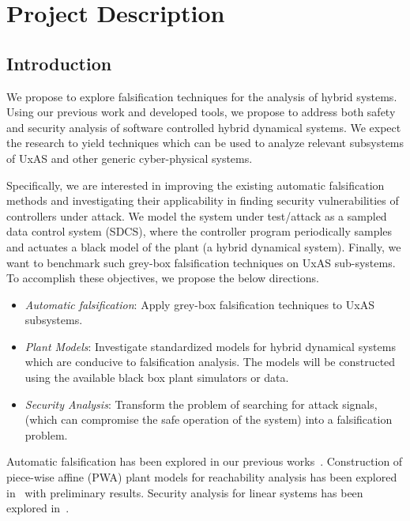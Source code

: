 \section{Project Description}

%
%
%

\subsection{Introduction}

We propose to explore falsification techniques for the analysis of
hybrid systems. Using our previous work and developed tools, we
propose to address both safety and security analysis of software
controlled hybrid dynamical systems. We expect the research to yield
techniques which can be used to analyze relevant subsystems of UxAS
and other generic cyber-physical systems.

Specifically, we are interested in improving the existing automatic
falsification methods and investigating their applicability in finding
security vulnerabilities of controllers under attack. We model the
system under test/attack as a sampled data control system (SDCS),
where the controller program periodically samples and actuates a
black model of the plant (a hybrid dynamical system). Finally, we want
to benchmark such grey-box falsification techniques on UxAS
sub-systems. To accomplish these objectives, we propose the below
directions.
\begin{itemize}
    \item \emph{Automatic falsification}: Apply grey-box falsification
        techniques to UxAS subsystems.
    \item \emph{Plant Models}: Investigate standardized models for
        hybrid dynamical systems which are conducive to falsification
        analysis. The models will be constructed using the available
        black box plant simulators or data.
    \item \emph{Security Analysis}:
        Transform the problem of searching for attack signals, (which
        can compromise the safe operation of the system) into a falsification
        problem.
\end{itemize}

Automatic falsification has been explored in our previous
works~\cite{Zutshi+Others/2013/Trajectory, zutshi2014multiple,
zutshi2016symbolic}. Construction of piece-wise affine (PWA) plant
models for reachability analysis has been explored
in~\cite{Zutshi2016} with preliminary results.  Security analysis for
linear systems has been explored in~\cite{pajic2014robustness,
pajic2015attack}.

